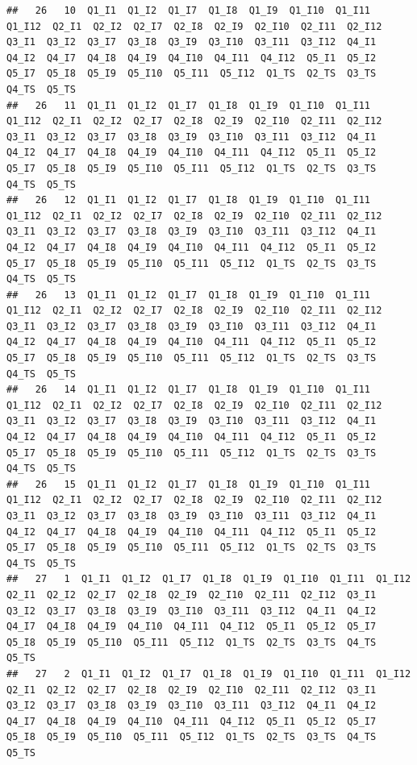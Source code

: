 \documentclass[]{book}
\begin{document}
\begin{verbatim}
##   26   10  Q1_I1  Q1_I2  Q1_I7  Q1_I8  Q1_I9  Q1_I10  Q1_I11  Q1_I12  Q2_I1  Q2_I2  Q2_I7  Q2_I8  Q2_I9  Q2_I10  Q2_I11  Q2_I12  Q3_I1  Q3_I2  Q3_I7  Q3_I8  Q3_I9  Q3_I10  Q3_I11  Q3_I12  Q4_I1  Q4_I2  Q4_I7  Q4_I8  Q4_I9  Q4_I10  Q4_I11  Q4_I12  Q5_I1  Q5_I2  Q5_I7  Q5_I8  Q5_I9  Q5_I10  Q5_I11  Q5_I12  Q1_TS  Q2_TS  Q3_TS  Q4_TS  Q5_TS
##   26   11  Q1_I1  Q1_I2  Q1_I7  Q1_I8  Q1_I9  Q1_I10  Q1_I11  Q1_I12  Q2_I1  Q2_I2  Q2_I7  Q2_I8  Q2_I9  Q2_I10  Q2_I11  Q2_I12  Q3_I1  Q3_I2  Q3_I7  Q3_I8  Q3_I9  Q3_I10  Q3_I11  Q3_I12  Q4_I1  Q4_I2  Q4_I7  Q4_I8  Q4_I9  Q4_I10  Q4_I11  Q4_I12  Q5_I1  Q5_I2  Q5_I7  Q5_I8  Q5_I9  Q5_I10  Q5_I11  Q5_I12  Q1_TS  Q2_TS  Q3_TS  Q4_TS  Q5_TS
##   26   12  Q1_I1  Q1_I2  Q1_I7  Q1_I8  Q1_I9  Q1_I10  Q1_I11  Q1_I12  Q2_I1  Q2_I2  Q2_I7  Q2_I8  Q2_I9  Q2_I10  Q2_I11  Q2_I12  Q3_I1  Q3_I2  Q3_I7  Q3_I8  Q3_I9  Q3_I10  Q3_I11  Q3_I12  Q4_I1  Q4_I2  Q4_I7  Q4_I8  Q4_I9  Q4_I10  Q4_I11  Q4_I12  Q5_I1  Q5_I2  Q5_I7  Q5_I8  Q5_I9  Q5_I10  Q5_I11  Q5_I12  Q1_TS  Q2_TS  Q3_TS  Q4_TS  Q5_TS
##   26   13  Q1_I1  Q1_I2  Q1_I7  Q1_I8  Q1_I9  Q1_I10  Q1_I11  Q1_I12  Q2_I1  Q2_I2  Q2_I7  Q2_I8  Q2_I9  Q2_I10  Q2_I11  Q2_I12  Q3_I1  Q3_I2  Q3_I7  Q3_I8  Q3_I9  Q3_I10  Q3_I11  Q3_I12  Q4_I1  Q4_I2  Q4_I7  Q4_I8  Q4_I9  Q4_I10  Q4_I11  Q4_I12  Q5_I1  Q5_I2  Q5_I7  Q5_I8  Q5_I9  Q5_I10  Q5_I11  Q5_I12  Q1_TS  Q2_TS  Q3_TS  Q4_TS  Q5_TS
##   26   14  Q1_I1  Q1_I2  Q1_I7  Q1_I8  Q1_I9  Q1_I10  Q1_I11  Q1_I12  Q2_I1  Q2_I2  Q2_I7  Q2_I8  Q2_I9  Q2_I10  Q2_I11  Q2_I12  Q3_I1  Q3_I2  Q3_I7  Q3_I8  Q3_I9  Q3_I10  Q3_I11  Q3_I12  Q4_I1  Q4_I2  Q4_I7  Q4_I8  Q4_I9  Q4_I10  Q4_I11  Q4_I12  Q5_I1  Q5_I2  Q5_I7  Q5_I8  Q5_I9  Q5_I10  Q5_I11  Q5_I12  Q1_TS  Q2_TS  Q3_TS  Q4_TS  Q5_TS
##   26   15  Q1_I1  Q1_I2  Q1_I7  Q1_I8  Q1_I9  Q1_I10  Q1_I11  Q1_I12  Q2_I1  Q2_I2  Q2_I7  Q2_I8  Q2_I9  Q2_I10  Q2_I11  Q2_I12  Q3_I1  Q3_I2  Q3_I7  Q3_I8  Q3_I9  Q3_I10  Q3_I11  Q3_I12  Q4_I1  Q4_I2  Q4_I7  Q4_I8  Q4_I9  Q4_I10  Q4_I11  Q4_I12  Q5_I1  Q5_I2  Q5_I7  Q5_I8  Q5_I9  Q5_I10  Q5_I11  Q5_I12  Q1_TS  Q2_TS  Q3_TS  Q4_TS  Q5_TS
##   27   1  Q1_I1  Q1_I2  Q1_I7  Q1_I8  Q1_I9  Q1_I10  Q1_I11  Q1_I12  Q2_I1  Q2_I2  Q2_I7  Q2_I8  Q2_I9  Q2_I10  Q2_I11  Q2_I12  Q3_I1  Q3_I2  Q3_I7  Q3_I8  Q3_I9  Q3_I10  Q3_I11  Q3_I12  Q4_I1  Q4_I2  Q4_I7  Q4_I8  Q4_I9  Q4_I10  Q4_I11  Q4_I12  Q5_I1  Q5_I2  Q5_I7  Q5_I8  Q5_I9  Q5_I10  Q5_I11  Q5_I12  Q1_TS  Q2_TS  Q3_TS  Q4_TS  Q5_TS
##   27   2  Q1_I1  Q1_I2  Q1_I7  Q1_I8  Q1_I9  Q1_I10  Q1_I11  Q1_I12  Q2_I1  Q2_I2  Q2_I7  Q2_I8  Q2_I9  Q2_I10  Q2_I11  Q2_I12  Q3_I1  Q3_I2  Q3_I7  Q3_I8  Q3_I9  Q3_I10  Q3_I11  Q3_I12  Q4_I1  Q4_I2  Q4_I7  Q4_I8  Q4_I9  Q4_I10  Q4_I11  Q4_I12  Q5_I1  Q5_I2  Q5_I7  Q5_I8  Q5_I9  Q5_I10  Q5_I11  Q5_I12  Q1_TS  Q2_TS  Q3_TS  Q4_TS  Q5_TS

\end{verbatim}
\end{document}
